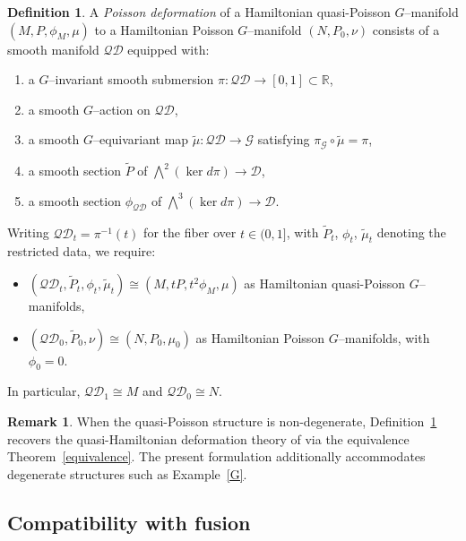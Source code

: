 \documentclass[reqno]{amsart}
\theoremstyle{plain}
\theoremstyle{definition}
\newtheorem{Def}[Thm]{Definition}
\newtheorem{Rem}[Thm]{Remark}
\newcommand{\R}{\mathbb{R}}
\begin{document}
\begin{Def}\label{Def 2.5}
A \emph{Poisson deformation} of a Hamiltonian quasi-Poisson $G$--manifold $(M,P,\phi_{M},\mu)$ to a Hamiltonian Poisson $G$--manifold $(N,P_{0},\nu)$ consists of a smooth manifold $\mathcal{QD}$ equipped with:
\begin{enumerate}
\item a $G$--invariant smooth submersion $\pi:\mathcal{QD}\to[0,1]\subset \R$,
\item a smooth $G$--action on $\mathcal{QD}$,
\item a smooth $G$--equivariant map $\tilde{\mu}:\mathcal{QD}\to\mathcal{G}$ satisfying $\pi_{\mathcal{G}}\circ\tilde{\mu}=\pi$,
\item a smooth section $\tilde{P}$ of $\bigwedge^{2}(\ker d\pi)\to\mathcal{D}$,
\item a smooth section $\phi_{\mathcal{QD}}$ of $\bigwedge^{3}(\ker d\pi)\to\mathcal{D}$.
\end{enumerate}
Writing $\mathcal{QD}_{t}=\pi^{-1}(t)$ for the fiber over $t\in(0,1]$, with $\tilde{P}_{t}$, $\phi_{t}$, $\tilde{\mu}_{t}$ denoting the restricted data, we require:
\begin{itemize}
\item $(\mathcal{QD}_{t},\tilde{P}_{t},\phi_{t},\tilde{\mu}_{t})\cong (M,tP,t^{2}\phi_{M},\mu)$ as Hamiltonian quasi-Poisson $G$--manifolds,
\item $(\mathcal{QD}_{0},\tilde{P}_{0},\nu)\cong (N,P_{0},\mu_{0})$ as Hamiltonian Poisson $G$--manifolds, with $\phi_{0}=0$.
\end{itemize}
In particular, $\mathcal{QD}_{1}\cong M$ and $\mathcal{QD}_{0}\cong N$.
\end{Def}

\begin{Rem}
When the quasi-Poisson structure is non-degenerate, Definition~\ref{Def 2.5} recovers the quasi-Hamiltonian deformation theory of \cite{JMM2025deformations} via the equivalence Theorem~\ref{equivalence}. The present formulation additionally accommodates degenerate structures such as Example~\ref{G}.
\end{Rem}

\subsection{Compatibility with fusion}\label{sec 3}
\end{document}
